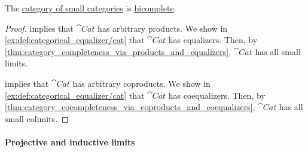 \begin{proposition}\label{thm:category_of_small_categories_is_bicomplete}
  The \hyperref[def:category_of_small_categories]{category of small categories} is \hyperref[def:bicomplete_category]{bicomplete}.
\end{proposition}
\begin{proof}
   implies that \( \cat{Cat} \) has arbitrary products. We show in \cref{ex:def:categorical_equalizer/cat} that \( \cat{Cat} \) has equalizers. Then, by \cref{thm:category_completeness_via_products_and_equalizers}, \( \cat{Cat} \) has all small limits.

   implies that \( \cat{Cat} \) has arbitrary coproducts. We show in \cref{ex:def:categorical_equalizer/cat} that \( \cat{Cat} \) has coequalizers. Then, by \cref{thm:category_cocompleteness_via_coproducts_and_coequalizers}, \( \cat{Cat} \) has all small colimits.
\end{proof}

\paragraph{Projective and inductive limits}

